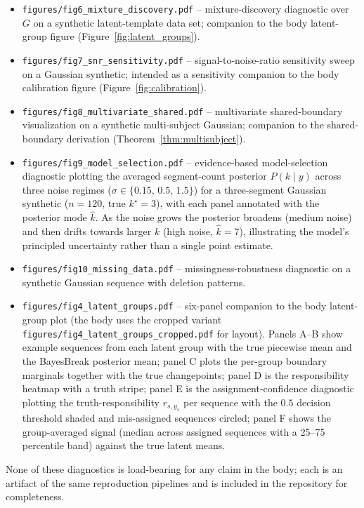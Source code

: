 \begin{itemize}\itemsep1pt
\item \texttt{figures/fig6\_mixture\_discovery.pdf} -- mixture-discovery diagnostic over $G$ on a
synthetic latent-template data set; companion to the body latent-group figure
(Figure~\ref{fig:latent_groups}).
\item \texttt{figures/fig7\_snr\_sensitivity.pdf} -- signal-to-noise-ratio sensitivity sweep on a
Gaussian synthetic; intended as a sensitivity companion to the body calibration figure
(Figure~\ref{fig:calibration}).
\item \texttt{figures/fig8\_multivariate\_shared.pdf} -- multivariate shared-boundary visualization
on a synthetic multi-subject Gaussian; companion to the shared-boundary derivation
(Theorem~\ref{thm:multisubject}).
\item \texttt{figures/fig9\_model\_selection.pdf} -- evidence-based model-selection diagnostic
plotting the averaged segment-count posterior $P(k\mid y)$ across three noise regimes
($\sigma\in\{0.15,\,0.5,\,1.5\}$) for a three-segment Gaussian synthetic ($n=120$, true
$k^{\star}=3$), with each panel annotated with the posterior mode $\hat k$. As the noise grows
the posterior broadens (medium noise) and then drifts towards larger $k$ (high noise, $\hat
k\!=\!7$), illustrating the model's principled uncertainty rather than a single point estimate.
\item \texttt{figures/fig10\_missing\_data.pdf} -- missingness-robustness diagnostic on a synthetic
Gaussian sequence with deletion patterns.
\item \texttt{figures/fig4\_latent\_groups.pdf} -- six-panel companion to the body latent-group
plot (the body uses the cropped variant \texttt{figures/fig4\_latent\_groups\_cropped.pdf} for
layout). Panels A--B show example sequences from each latent group with the true piecewise mean
and the BayesBreak posterior mean; panel C plots the per-group boundary marginals together with
the true changepoints; panel D is the responsibility heatmap with a truth stripe; panel E is the
assignment-confidence diagnostic plotting the truth-responsibility $r_{s,y_s}$ per sequence with
the $0.5$ decision threshold shaded and mis-assigned sequences circled; panel F shows the
group-averaged signal (median across assigned sequences with a 25--75 percentile band) against
the true latent means.
\end{itemize}
None of these diagnostics is load-bearing for any claim in the body; each is an artifact of the
same reproduction pipelines and is included in the repository for completeness.

